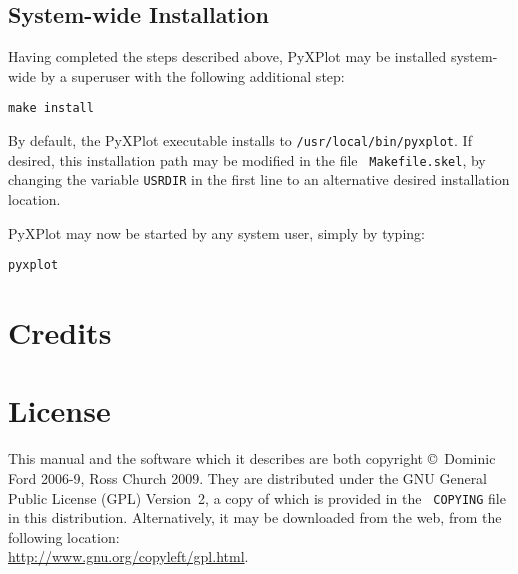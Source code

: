 \subsection{System-wide Installation}

Having completed the steps described above, PyXPlot may be installed
system-wide by a superuser with the following additional
step:

\begin{verbatim}
make install
\end{verbatim}

By default, the PyXPlot executable installs to {\tt /usr/local/bin/pyxplot}.
If desired, this installation path may be modified in the file {\tt
Makefile.skel}, by changing the variable {\tt USRDIR} in the first line to an
alternative desired installation location.

PyXPlot may now be started by any system user, simply by typing:

\begin{verbatim}
pyxplot
\end{verbatim}

\section{Credits}


\section{License}

This manual and the software which it describes are both copyright \copyright\
Dominic Ford 2006-9, Ross Church 2009. They are distributed under the GNU
General Public License (GPL) Version~2, a copy of which is provided in the {\tt
COPYING} file in this distribution. Alternatively, it may be downloaded from the web, from
the following location:\\ \url{http://www.gnu.org/copyleft/gpl.html}.

